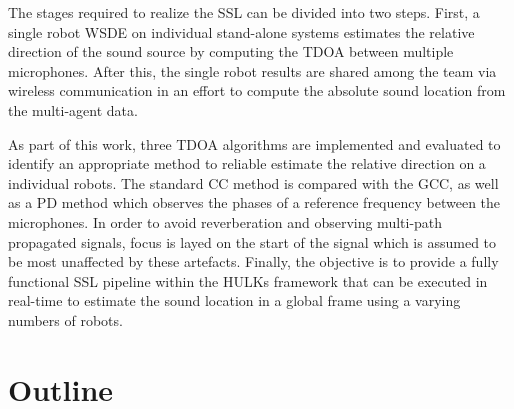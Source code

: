 The stages required to realize the \ac{SSL} can be divided into two steps.
First, a single robot \ac{WSDE} on individual stand-alone systems estimates the
relative direction of the sound source by computing the \ac{TDOA} between
multiple microphones. After this, the single robot results are shared among the team
via wireless communication in an effort to compute the absolute sound location
from the multi-agent data.


As part of this work, three \ac{TDOA} algorithms are implemented and evaluated
to identify an appropriate method to reliable estimate the relative direction
on a individual robots. The standard \acf{CC} method is compared with the
\acf{GCC}, as well as a \ac{PD} method which observes the phases of a reference
frequency between the microphones. In order to avoid reverberation and
observing multi-path propagated signals, focus is layed on the start of the
signal which is assumed to be most unaffected by these artefacts. Finally, the
objective is to provide a fully functional \ac{SSL} pipeline within the HULKs
framework that can be executed in real-time to estimate the sound location in
a global frame using a varying numbers of robots.


\section{Outline}
\label{sec:01_outline}


